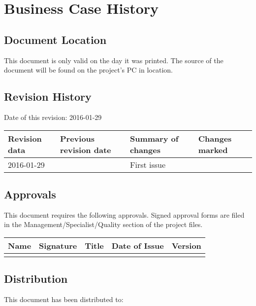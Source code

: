 \documentclass{report}
\begin{document}
\businesscase
{}
\date{\today}
\author{P.Ryzhov}
\maketitle

\chapter{Business Case History}

\section{Document Location}
This document is only valid on the day it was printed.
The source of the document will be found on the project's PC in location.

\section{Revision History}

Date of this revision: 2016-01-29

\begin{center}
    \begin{tabular}{| p{2cm} | p{2cm} | l | p{2cm} |}
    \hline
    Revision data & Previous revision date & Summary of changes & Changes marked \\
    \hline
    2016-01-29 & & First issue & \\
    \hline
    \end{tabular}
\end{center}

\section{Approvals}
This document requires the following approvals.
Signed approval forms are filed in the Management/Specialist/Quality section of the project files.

\begin{center}
    \begin{tabular}{| p{2cm} | p{2cm} | l | p{2cm} | p{2cm} |}
    \hline
    Name & Signature & Title & Date of Issue & Version \\
    \hline
     & & & & \\
    \hline
    \end{tabular}
\end{center}

\section{Distribution}
This document has been distributed to:
\end{document}
